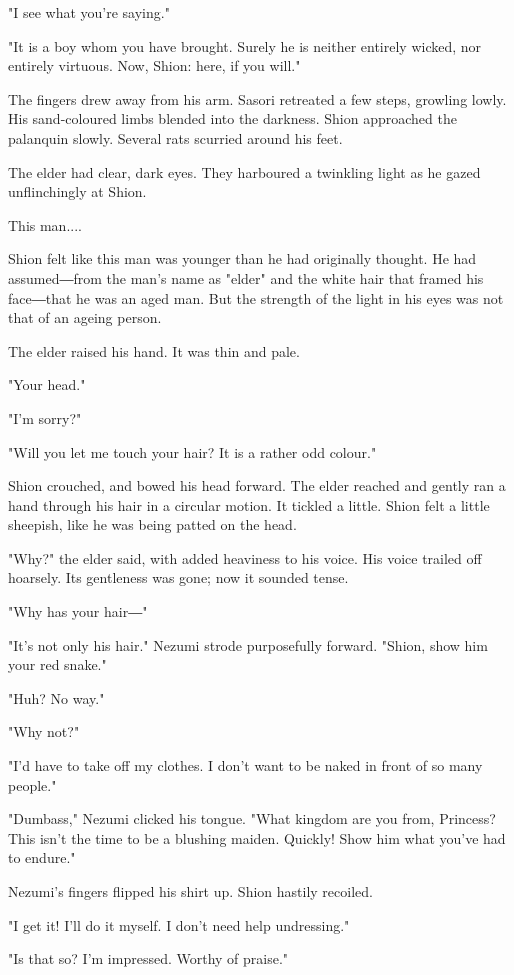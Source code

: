 "I see what you're saying."

"It is a boy whom you have brought. Surely he is neither entirely
wicked, nor entirely virtuous. Now, Shion: here, if you will."

The fingers drew away from his arm. Sasori retreated a few steps,
growling lowly. His sand-coloured limbs blended into the darkness. Shion
approached the palanquin slowly. Several rats scurried around his feet.~

The elder had clear, dark eyes. They harboured a twinkling light as he
gazed unflinchingly at Shion.

This man....

Shion felt like this man was younger than he had originally thought. He
had assumed―from the man's name as "elder" and the white hair that
framed his face―that he was an aged man. But the strength of the light
in his eyes was not that of an ageing person.

The elder raised his hand. It was thin and pale.

"Your head."

"I'm sorry?"

"Will you let me touch your hair? It is a rather odd colour."

Shion crouched, and bowed his head forward. The elder reached and gently
ran a hand through his hair in a circular motion. It tickled a little.
Shion felt a little sheepish, like he was being patted on the head.

"Why?" the elder said, with added heaviness to his voice. His voice
trailed off hoarsely. Its gentleness was gone; now it sounded tense.

"Why has your hair―"

"It's not only his hair." Nezumi strode purposefully forward. "Shion,
show him your red snake."

"Huh? No way."

"Why not?"

"I'd have to take off my clothes. I don't want to be naked in front of
so many people."

"Dumbass," Nezumi clicked his tongue. "What kingdom are you from,
Princess? This isn't the time to be a blushing maiden. Quickly! Show him
what you've had to endure."

Nezumi's fingers flipped his shirt up. Shion hastily recoiled.

"I get it! I'll do it myself. I don't need help undressing."

"Is that so? I'm impressed. Worthy of praise."

